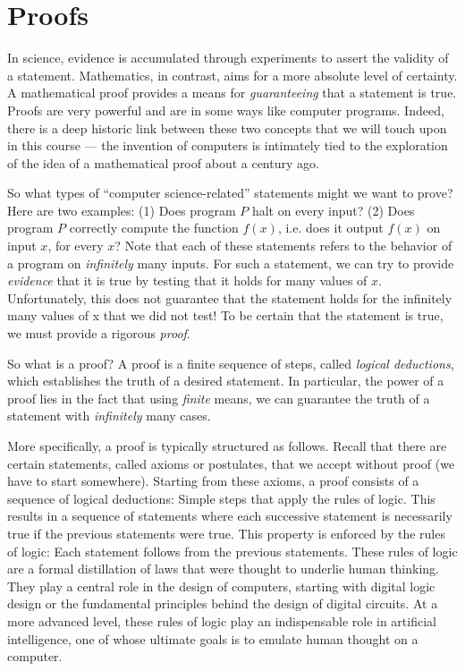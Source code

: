 \documentclass[11pt]{article}
\begin{document}
\maketitle
\section{Proofs}

In science, evidence is accumulated through experiments to assert the validity of a statement.
Mathematics, in contrast, aims for a more absolute level of certainty.
A mathematical proof provides a means for {\em guaranteeing} that a statement is true.
Proofs are very powerful and are in some ways like computer programs. Indeed, there is
a deep historic link between these two concepts that we will touch upon in this course ---
the invention of computers is intimately tied to the exploration of the idea of a mathematical proof about a
century ago.

So what types of ``computer science-related'' statements might we want to prove? Here are two examples:
(1) Does program $P$ halt on every input?
(2) Does program $P$ correctly compute the function $f(x)$,
i.e. does it output $f(x)$ on input $x$, for every $x$?
Note that each of these statements refers to the behavior of
a program on \emph{infinitely} many inputs. For such a statement, we
can try to provide \emph{evidence} that it is true by testing that it holds for
many values of $x$. Unfortunately, this does not guarantee that the statement
holds for the infinitely many values of x that we did not test! To be certain
that the statement is true, we must provide a rigorous \emph{proof}.

So what is a proof? A proof is a finite sequence of steps, called \emph{logical deductions}, which
establishes the truth of a desired statement. In particular, the power of a proof lies in the fact that using \emph{finite} means, we can guarantee the truth of a statement with \emph{infinitely} many cases.

More specifically, a proof is typically structured as follows. Recall that there are certain statements, called axioms or postulates,
that we accept without proof (we have to start somewhere). Starting from these
axioms, a proof consists of a sequence of logical deductions: Simple steps that
apply the rules of logic. This results in a sequence of statements where
each successive statement is necessarily true if the previous statements
were true. This property is enforced by the rules of logic: Each statement
follows from the previous statements. These rules of logic are a formal distillation of
laws that were thought to underlie human thinking. They play a
central role in the design of computers, starting with digital logic
design or the fundamental principles behind the design of digital
circuits. At a more advanced level, these rules of logic play an
indispensable role in artificial intelligence, one of whose ultimate goals
is to emulate human thought on a computer.
\end{document}

